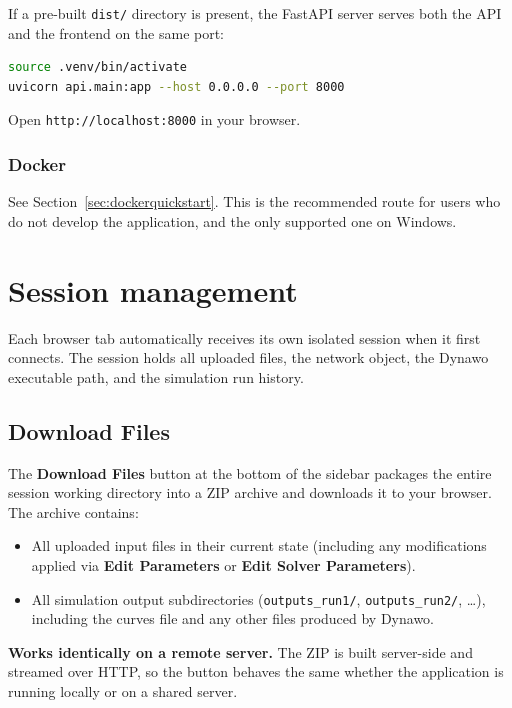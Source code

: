 \documentclass[a4paper,11pt]{article}
\newcommand{\code}[1]{\texttt{\small #1}}
\begin{document}
If a pre-built \code{dist/} directory is present, the FastAPI server serves
both the API and the frontend on the same port:

\begin{lstlisting}[language=bash]
source .venv/bin/activate
uvicorn api.main:app --host 0.0.0.0 --port 8000
\end{lstlisting}

Open \code{http://localhost:8000} in your browser.

\subsubsection{Docker}

See Section~\ref{sec:dockerquickstart}. This is the recommended route for users
who do not develop the application, and the only supported one on Windows.

\section{Session management}
\label{sec:session}

Each browser tab automatically receives its own isolated session when it first
connects. The session holds all uploaded files, the network object, the Dynawo
executable path, and the simulation run history.

\subsection{Download Files}

The \textbf{Download Files} button at the bottom of the sidebar packages the
entire session working directory into a ZIP archive and downloads it to your
browser. The archive contains:

\begin{itemize}[leftmargin=2em]
  \item All uploaded input files in their current state (including any
    modifications applied via \textbf{Edit Parameters} or \textbf{Edit Solver
    Parameters}).
  \item All simulation output subdirectories (\code{outputs\_run1/},
    \code{outputs\_run2/}, \ldots), including the curves file and any
    other files produced by Dynawo.
\end{itemize}

\begin{notebox}
\textbf{Works identically on a remote server.} The ZIP is built server-side
and streamed over HTTP, so the button behaves the same whether the application
is running locally or on a shared server.
\end{notebox}
\end{document}
